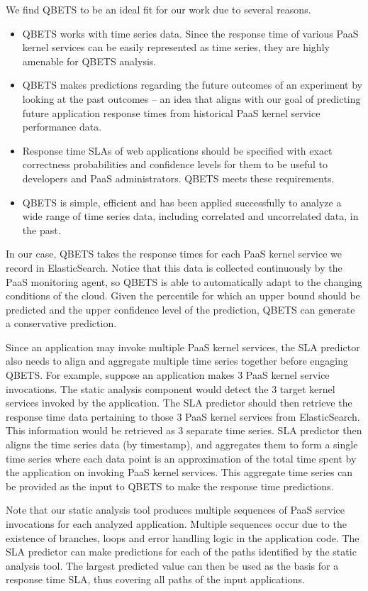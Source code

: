 We find QBETS to be an ideal fit for our work due to several reasons. 
\begin{itemize}
\item QBETS works with time series data. Since the response time
of various PaaS kernel services can be easily represented as time series,
they are highly amenable for QBETS analysis. 
\item QBETS makes predictions regarding the
future outcomes of an experiment by looking at the past 
outcomes -- an idea that aligns with our
goal of predicting future application response times from historical PaaS kernel service performance data. 
\item Response time
SLAs of web applications should be specified with exact correctness 
probabilities and confidence levels for
them to be useful to developers and PaaS administrators. QBETS meets these requirements.
\item QBETS is 
simple, efficient and has been applied successfully to analyze a wide range of time series 
data, including correlated and uncorrelated data, in the past.
\end{itemize}

In our case, QBETS takes the response times for each PaaS kernel service 
we record in ElasticSearch.
Notice that this data is collected continuously by the PaaS monitoring agent, 
so QBETS is able to automatically adapt to the changing conditions of the cloud. 
Given the percentile for which 
an upper bound should be predicted and the upper confidence level of the prediction, 
QBETS can generate a conservative prediction. 

Since an application may invoke multiple PaaS kernel services, the SLA predictor also needs
to align and aggregate multiple time series together before engaging QBETS. For example, suppose
an application makes 3 PaaS kernel service invocations. The static analysis component would detect the
3 target kernel services invoked by the application. The SLA predictor should then retrieve the response time
data pertaining to those 3 PaaS kernel services from ElasticSearch. This information would be retrieved as
3 separate time series. SLA predictor then aligns the time series data (by timestamp), and aggregates them
to form a single time series where each data point is an approximation of the total time spent by the application
on invoking PaaS kernel services. This aggregate time series can be provided as the input to QBETS to
make the response time predictions.

Note that our static analysis tool produces multiple sequences of PaaS service invocations for each
analyzed application. Multiple sequences occur due to the existence of branches, loops and error handling
logic in the application code. The SLA predictor can make predictions for each of the paths identified
by the static analysis tool.  The largest predicted value can then be used as the basis for a response time
SLA, thus covering all paths of the input applications.

